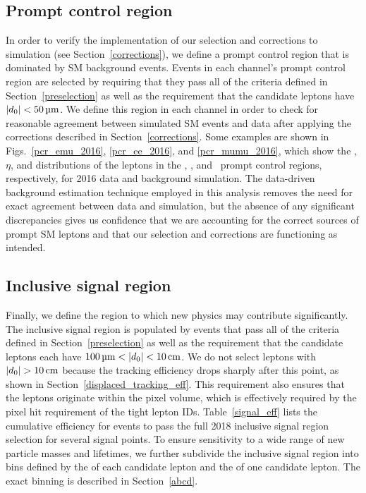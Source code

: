 \subsection{Prompt control region}
\label{pcr}
In order to verify the implementation of our selection and corrections to simulation (see Section~\ref{corrections}), we define a prompt control region that is dominated by SM background events. Events in each channel's prompt control region are selected by requiring that they pass all of the criteria defined in Section~\ref{preselection} as well as the requirement that the candidate leptons have $\ad<\SI{50}{\um}$. We define this region in each channel in order to check for reasonable agreement between simulated SM events and data after applying the corrections described in Section~\ref{corrections}. Some examples are shown in Figs.~\ref{pcr_emu_2016}, \ref{pcr_ee_2016}, and \ref{pcr_mumu_2016}, which show the \pt, $\eta$, and \ad distributions of the leptons in the \Pe\Pgm, \Pe\Pe, and \Pgm\Pgm\ prompt control regions, respectively, for 2016 data and background simulation. The data-driven background estimation technique employed in this analysis removes the need for exact agreement between data and simulation, but the absence of any significant discrepancies gives us confidence that we are accounting for the correct sources of prompt SM leptons and that our selection and corrections are functioning as intended.





\subsection{Inclusive signal region}
Finally, we define the region to which new physics may contribute significantly. The inclusive signal region is populated by events that pass all of the criteria defined in Section~\ref{preselection} as well as the requirement that the candidate leptons each have $\SI{100}{\um}<\ad<\SI{10}{\cm}$. We do not select leptons with $\ad>\SI{10}{\cm}$ because the tracking efficiency drops sharply after this point, as shown in Section~\ref{displaced_tracking_eff}. This requirement also ensures that the leptons originate within the pixel volume, which is effectively required by the pixel hit requirement of the tight lepton IDs. Table~\ref{signal_eff} lists the cumulative efficiency for \stoptolb events to pass the full 2018 inclusive signal region selection for several signal points. To ensure sensitivity to a wide range of new particle masses and lifetimes, we further subdivide the inclusive signal region into bins defined by the \ad of each candidate lepton and the \pt of one candidate lepton. The exact binning is described in Section~\ref{abcd}.



\pagebreak